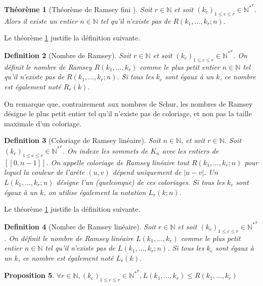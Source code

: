 \documentclass{article}
\newtheorem{definition}{Definition}[section]
\newtheorem{theorem}[definition]{Théorème}
\newtheorem{proposition}[definition]{Proposition}
\begin{document}
\begin{theorem}[Théorème de Ramsey fini \cite{Ramsey}]
\label{thm:ram}
Soit \(r \in \mathbb{N}\) et soit \((k_c)_{1 \leqslant c \leqslant r} \in {\mathbb{N}^*}^r\). Alors il existe un entier \(n \in \mathbb{N}\) tel qu'il n'existe pas de \(R(k_1, ..., k_r ; n)\).
\end{theorem}

Le théorème \ref{thm:ram} justifie la définition suivante.

\begin{definition}[Nombre de Ramsey]
Soit \(r \in \mathbb{N}\) et soit \((k_c)_{1 \leqslant c \leqslant r} \in {\mathbb{N}^*}^r\). On définit le nombre de Ramsey \(R(k_1, ..., k_r)\) comme le plus petit entier \(n \in \mathbb{N}\) tel qu'il n'existe pas de \(R(k_1, ..., k_r ; n)\). Si tous les \(k_c\) sont égaux à un \(k\), ce nombre est également noté \(R_r(k)\).
\end{definition}

On remarque que, contrairement aux nombres de Schur, les nombres de Ramsey désigne le plus petit entier tel qu'il n'existe pas de coloriage, et non pas la taille maximale d'un coloriage.

\begin{definition}[Coloriage de Ramsey linéaire]
Soit \(n \in \mathbb{N}\), et soit \(r \in \mathbb{N}\). Soit \((k_c)_{1 \leqslant c \leqslant r} \in {\mathbb{N}^*}^r\). On indexe les sommets de \(K_n\) avec les entiers de \([\![0, n - 1]\!]\). On appelle coloriage de Ramsey linéaire tout \(R(k_1, ..., k_r ; n)\) pour lequel la couleur de l'arête \((u, v)\) dépend uniquement de \(|u - v|\). Un \(L(k_1, ..., k_r ; n)\) désigne l'un (quelconque) de ces coloriages. Si tous les \(k_c\) sont égaux à un \(k\), on utilise également la notation \(L_r(k; n)\).
\end{definition}

Le théorème \ref{thm:ram} justifie la définition suivante.

\begin{definition}[Nombre de Ramsey linéaire]
Soit \(r \in \mathbb{N}\) et soit \((k_c)_{1 \leqslant c \leqslant r} \in {\mathbb{N}^*}^r\). On définit le nombre de Ramsey linéaire \(L(k_1, ..., k_r)\) comme le plus petit entier \(n \in \mathbb{N}\) tel qu'il n'existe pas de \(L(k_1, ..., k_r ; n)\). Si tous les \(k_c\) sont égaux à un \(k\), ce nombre est également noté \(L_r(k)\).
\end{definition}

\begin{proposition}
\(\forall r \in \mathbb{N}, (k_c)_{1 \leqslant c \leqslant r} \in {\mathbb{N}^*}^r, L(k_1, ..., k_r) \leqslant R(k_1, ..., k_r)\)
\end{proposition}
\end{document}
